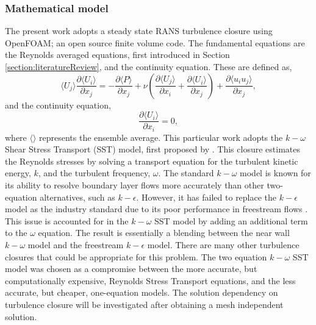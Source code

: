 \documentclass[12pt,oneside,a4paper]{article}
\newcommand{\pdev}[2]{\frac{\partial {#1}}{\partial {#2}}}
\begin{document}
\subsubsection{Mathematical model}
\label{section:rans:maths}
The present work adopts a steady state RANS turbulence closure using OpenFOAM; an open source finite volume code. The fundamental equations are the Reynolds averaged equations, first introduced in Section \ref{section:literatureReview}, and the continuity equation. These are defined as,
\begin{equation}
\label{equation:rans:mom}
\langle U_j \rangle \pdev{\langle U_i \rangle}{x_j}
=
-\pdev{\langle P \rangle}{x_j}
+
\nu
	\left(
	\pdev{\langle U_j \rangle}{x_i}
	+
	\pdev{\langle U_i \rangle}{x_j} 
	\right)
+
\pdev{\langle u_i u_j\rangle}{x_j},
\end{equation}
and the continuity equation,
\begin{equation}
\label{equation:rans:cont}
\pdev{\langle U_i\rangle}{x_i}=0,
\end{equation}
where $\langle  \rangle$ represents the ensemble average. This particular work adopts the $k-\omega$ Shear Stress Transport (SST) model,  first proposed by \cite{menter1994}. This closure estimates the Reynolds stresses by solving a transport equation for the turbulent kinetic energy, $k$, and the turbulent frequency, $\omega$. The standard $k-\omega$ model is known for its ability to resolve boundary layer flows more accurately than other two-equation alternatives, such as $k-\epsilon$. However, it has failed to replace the $k-\epsilon$ model as the industry standard due to its poor performance in freestream flows \citep{menter2003}. This issue is accounted for in the $k-\omega$ SST model by adding an additional term to the $\omega$ equation. The result is essentially a blending between the near wall $k-\omega$ model and the freestream $k-\epsilon$ model. There are many other turbulence closures that could be appropriate for this problem. The two equation $k-\omega$ SST model was chosen as a compromise between the more accurate, but computationally expensive, Reynolds Stress Transport equations, and the less accurate, but cheaper, one-equation models. The solution dependency on turbulence closure will be investigated after obtaining a mesh independent solution.  
\end{document}

